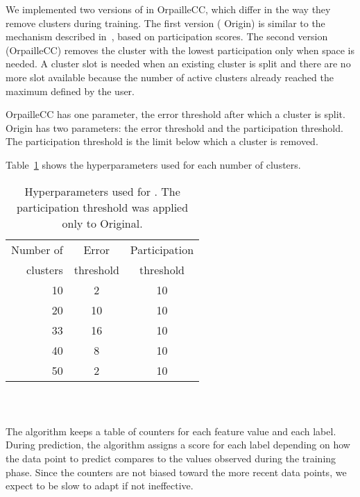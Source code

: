 We implemented two versions of \mcnn in
OrpailleCC, which differ in the way they remove
clusters during training. The first version (\mcnn
Origin) is similar to the mechanism described
in~\cite{mc-nn}, based on participation scores.
The second version (\mcnn OrpailleCC)
removes the cluster with the lowest participation
only when space is needed.  A cluster slot is
needed when an existing cluster is split and there
are no more slot available because the number of
active clusters already reached the maximum defined
by the user.

\mcnn OrpailleCC has one
parameter, the error threshold after which a
cluster is split.  \mcnn Origin has two
parameters: the error threshold and the
participation threshold. The participation
threshold is the limit below which a cluster is
removed.

Table~\ref{table:hyperparameter-mcnn} shows
the hyperparameters used for each number of
clusters. 
\begin{table}
		\begin{center}
			\begin{tabular}{|| r | c | c ||} 
				\hline
					Number of &  Error & Participation\\ [0.5ex] 
					clusters & threshold & threshold\\[0.5ex]
				\hline\hline
					10 & 2 & 10\\
					20 & 10 & 10\\
					33 & 16 & 10\\
					40 & 8 & 10\\
					50 & 2 & 10\\
				\hline
			\end{tabular}
		\end{center}
		\caption{Hyperparameters used for \mcnn. The
		participation threshold was applied only to
		\mcnn Original.}
		\label{table:hyperparameter-mcnn}
\end{table}

\subsubsection{\naivebayes~\cite{naive_bayes}}
The \naivebayes algorithm keeps a table of
counters for each feature value and each label.
During prediction, the algorithm assigns a
score for each label depending on how the data
point to predict compares to the values observed
during the training phase. Since the counters are
not biased toward the more recent data points, we
expect \naivebayes to be slow to adapt if not
ineffective.

